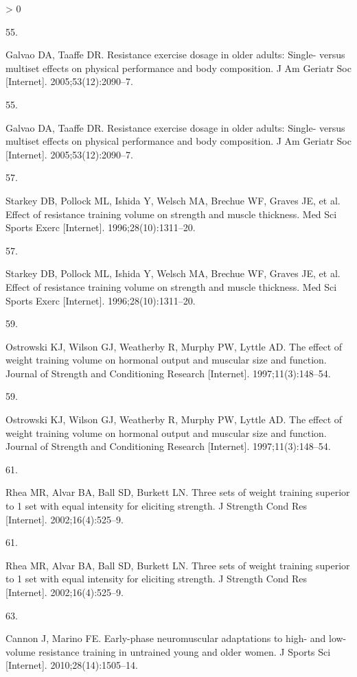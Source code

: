 \documentclass[twoside,10pt]{gihclass} %
\newlength{\cslhangindent}
\newlength{\csllabelwidth}
\newenvironment{CSLReferences}[3] %
 {%
  \setlength{\parindent}{0pt}
  \ifodd #1 \everypar{\setlength{\hangindent}{\cslhangindent}}\ignorespaces\fi
  \ifnum #2 > 0
  \setlength{\parskip}{#2\baselineskip}
  \fi
 }%
 {}
\newcommand{\CSLLeftMargin}[1]{\parbox[t]{\maxof{\widthof{#1}}{\csllabelwidth}}{#1}}
\newcommand{\CSLRightInline}[1]{\parbox[t]{\linewidth}{#1}}
\begin{document}
\begin{CSLReferences}{0}{0}
\leavevmode\hypertarget{ref-RN1472}{}%
\CSLLeftMargin{55. }
\CSLRightInline{Galvao DA, Taaffe DR. Resistance exercise dosage in older adults: Single- versus multiset effects on physical performance and body composition. J Am Geriatr Soc {[}Internet{]}. 2005;53(12):2090--7. }

\leavevmode\hypertarget{ref-RN1472}{}%
\CSLLeftMargin{55. }
\CSLRightInline{Galvao DA, Taaffe DR. Resistance exercise dosage in older adults: Single- versus multiset effects on physical performance and body composition. J Am Geriatr Soc {[}Internet{]}. 2005;53(12):2090--7. }

\leavevmode\hypertarget{ref-RN1456}{}%
\CSLLeftMargin{57. }
\CSLRightInline{Starkey DB, Pollock ML, Ishida Y, Welsch MA, Brechue WF, Graves JE, et al. Effect of resistance training volume on strength and muscle thickness. Med Sci Sports Exerc {[}Internet{]}. 1996;28(10):1311--20. }

\leavevmode\hypertarget{ref-RN1456}{}%
\CSLLeftMargin{57. }
\CSLRightInline{Starkey DB, Pollock ML, Ishida Y, Welsch MA, Brechue WF, Graves JE, et al. Effect of resistance training volume on strength and muscle thickness. Med Sci Sports Exerc {[}Internet{]}. 1996;28(10):1311--20. }

\leavevmode\hypertarget{ref-RN1454}{}%
\CSLLeftMargin{59. }
\CSLRightInline{Ostrowski KJ, Wilson GJ, Weatherby R, Murphy PW, Lyttle AD. The effect of weight training volume on hormonal output and muscular size and function. Journal of Strength and Conditioning Research {[}Internet{]}. 1997;11(3):148--54. }

\leavevmode\hypertarget{ref-RN1454}{}%
\CSLLeftMargin{59. }
\CSLRightInline{Ostrowski KJ, Wilson GJ, Weatherby R, Murphy PW, Lyttle AD. The effect of weight training volume on hormonal output and muscular size and function. Journal of Strength and Conditioning Research {[}Internet{]}. 1997;11(3):148--54. }

\leavevmode\hypertarget{ref-RN1384}{}%
\CSLLeftMargin{61. }
\CSLRightInline{Rhea MR, Alvar BA, Ball SD, Burkett LN. Three sets of weight training superior to 1 set with equal intensity for eliciting strength. J Strength Cond Res {[}Internet{]}. 2002;16(4):525--9. }

\leavevmode\hypertarget{ref-RN1384}{}%
\CSLLeftMargin{61. }
\CSLRightInline{Rhea MR, Alvar BA, Ball SD, Burkett LN. Three sets of weight training superior to 1 set with equal intensity for eliciting strength. J Strength Cond Res {[}Internet{]}. 2002;16(4):525--9. }

\leavevmode\hypertarget{ref-RN1382}{}%
\CSLLeftMargin{63. }
\CSLRightInline{Cannon J, Marino FE. Early-phase neuromuscular adaptations to high- and low-volume resistance training in untrained young and older women. J Sports Sci {[}Internet{]}. 2010;28(14):1505--14. }


\end{CSLReferences}
\end{document}
